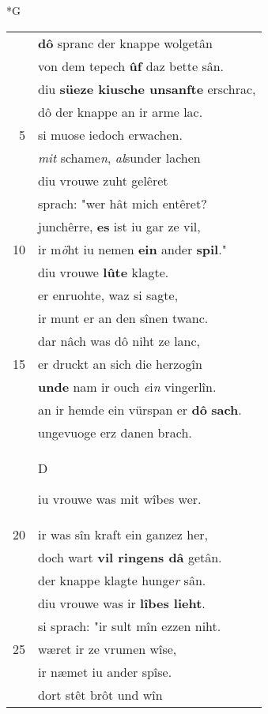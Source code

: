 \documentclass[8pt,a4paper,notitlepage]{article}
\begin{document}
\begin{table}[ht]
\begin{minipage}[t]{0.5\linewidth}
\small
\begin{center}*G
\end{center}
\begin{tabular}{rl}
 & \textbf{dô} spranc der knappe wolgetân\\ 
 & von dem tepech \textbf{ûf} daz bette sân.\\ 
 & diu \textbf{süeze kiusche unsanfte} erschrac,\\ 
 & dô der knappe an ir arme lac.\\ 
5 & si muose iedoch erwachen.\\ 
 & \textit{mit} schame\textit{n}, \textit{al}sunder lachen\\ 
 & diu vrouwe zuht gelêret\\ 
 & sprach: "wer hât mich entêret?\\ 
 & junchêrre, \textbf{es} ist iu gar ze vil,\\ 
10 & ir m\textit{ö}ht iu nemen \textbf{ein} ander \textbf{spil}."\\ 
 & diu vrouwe \textbf{lûte} klagte.\\ 
 & er enruohte, waz si sagte,\\ 
 & ir munt er an den sînen twanc.\\ 
 & dar nâch was dô niht ze lanc,\\ 
15 & er druckt an sich die herzogîn\\ 
 & \textbf{unde} nam ir ouch \textit{e}i\textit{n} vingerlîn.\\ 
 & an ir hemde ein vürspan er \textbf{dô} \textbf{sach}.\\ 
 & ungevuoge erz danen brach.\\ 
 & \begin{large}D\end{large}iu vrouwe was mit wîbes wer.\\ 
20 & ir was sîn kraft ein ganzez her,\\ 
 & doch wart \textbf{vil ringens dâ} getân.\\ 
 & der knappe klagte hunge\textit{r} sân.\\ 
 & diu vrouwe was ir \textbf{lîbes lieht}.\\ 
 & si sprach: "ir sult mîn ezzen niht.\\ 
25 & wæret ir ze vrumen wîse,\\ 
 & ir næmet iu ander spîse.\\ 
 & dort stêt brôt und wîn\\ 

\end{tabular}
\end{minipage}
\end{table}
\end{document}
